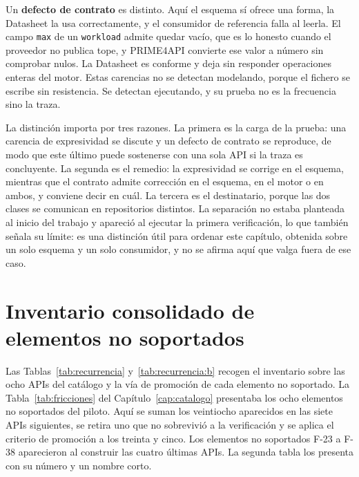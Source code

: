Un \textbf{defecto de contrato} es distinto. Aquí el esquema sí ofrece una forma,
la Datasheet la usa correctamente, y el consumidor de referencia falla al leerla.
El campo \texttt{max} de un \texttt{workload} admite quedar vacío, que es lo
honesto cuando el proveedor no publica tope, y PRIME4API convierte ese valor a
número sin comprobar nulos. La Datasheet es conforme y deja sin responder operaciones enteras del motor.
Estas carencias no se detectan modelando, porque el fichero se escribe sin
resistencia. Se detectan ejecutando, y su prueba no es la frecuencia sino la
traza.

La distinción importa por tres razones. La primera es la carga de la prueba: una
carencia de expresividad se discute y un defecto de contrato se reproduce, de modo
que este último puede sostenerse con una sola API si la traza es concluyente. La
segunda es el remedio: la expresividad se corrige en el esquema, mientras que el
contrato admite corrección en el esquema, en el motor o en ambos, y conviene decir
en cuál. La tercera es el destinatario, porque las dos clases se comunican en
repositorios distintos. La separación no estaba planteada al inicio del trabajo y
apareció al ejecutar la primera verificación, lo que también señala su límite: es
una distinción útil para ordenar este capítulo, obtenida sobre un solo esquema y
un solo consumidor, y no se afirma aquí que valga fuera de ese caso.

\section{Inventario consolidado de elementos no soportados}
\label{sec:evolucion:inventario}

Las Tablas~\ref{tab:recurrencia} y~\ref{tab:recurrencia:b} recogen el inventario sobre las ocho APIs del catálogo y la vía de promoción de cada elemento no soportado.
La Tabla~\ref{tab:fricciones} del Capítulo~\ref{cap:catalogo} presentaba los ocho elementos no soportados del piloto.
Aquí se suman los veintiocho aparecidos en las siete APIs siguientes, se retira uno que no sobrevivió a la verificación y se aplica el criterio de promoción a los treinta y cinco.
Los elementos no soportados F-23 a F-38 aparecieron al construir las cuatro últimas APIs.
La segunda tabla los presenta con su número y un nombre corto.

